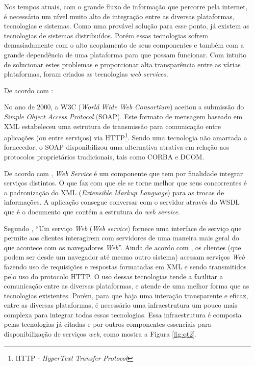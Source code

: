 	
	\par Nos tempos atuais, com o grande fluxo de informação que percorre pela
internet, é necessário um nível muito alto de integração entre as diversas
plataformas, tecnologias e sistemas. Como uma provável solução para esse ponto,
já existem as tecnologias de sistemas distribuídos. Porém essas tecnologias
sofrem demasiadamente com o alto acoplamento de seus componentes e também com a
grande dependência de uma plataforma para que possam funcionar. Com intuito de
solucionar estes problemas e proporcionar alta transparência entre as várias
plataformas, foram criados as tecnologias \textit{web services}.
	
	
	\par De acordo com :
	\begin{citacao}
		No ano de 2000, a W3C (\textit{World Wide Web Consortium}) aceitou a submissão
		do \textit{Simple Object Access Protocol} (SOAP). Este formato de mensagem
		baseado em XML estabeleceu uma estrutura de transmissão para comunicação entre
		aplicações (ou entre serviços) via HTTP\footnote{HTTP - \textit{HyperText
		Transfer Protocol}}. Sendo uma tecnologia não amarrada a fornecedor, o SOAP
		disponibilizou uma alternativa atrativa em relação aos protocolos
		proprietários tradicionais, tais como CORBA e DCOM.
	\end{citacao}
	
	\par De acordo com , \textit{Web Service} é um
componente que tem por finalidade integrar serviços distintos. O que faz com
que ele se torne melhor que seus concorrentes é a padronização do XML
(\textit{Extensible Markup Language}) para as trocas de informações. A
aplicação consegue conversar com o servidor através do  WSDL que é o documento
que contém a estrutura do \textit{web service}.
	
	\par Segundo , “Um serviço \textit{Web} (\textit{Web
service}) fornece uma interface de serviço que permite aos clientes interagirem
com servidores de uma maneira mais geral do que acontece com os navegadores
\textit{Web}”. Ainda de acordo com , os clientes (que
podem ser desde um navegador até mesmo outro sistema) acessam serviços 
\textit{Web} fazendo uso de requisições e respostas formatadas em XML e sendo
transmitidos pelo uso do protocolo HTTP. O uso dessas tecnologias tende a
facilitar a comunicação entre as diversas plataformas, e atende de uma
melhor forma que as tecnologias existentes. Porém, para que haja uma
interação transparente e eficaz, entre as diversas plataformas, é necessário uma
infraestrutura um pouco mais complexa para integrar todas essas tecnologias.
Essa infraestrutura é composta pelas tecnologias já citadas e por outros
componentes essenciais para disponibilização de serviços \textit{web}, como
mostra a Figura \ref{fig:qt2}.

